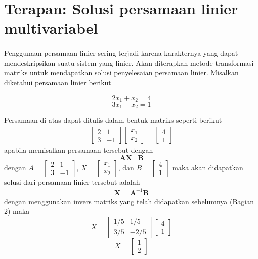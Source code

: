 \section{Terapan: Solusi persamaan linier multivariabel}
		\paragraph*{} Penggunaan persamaan linier sering terjadi karena karakternya yang dapat mendeskripsikan suatu sistem yang linier. Akan diterapkan metode transformasi matriks untuk mendapatkan solusi penyelesaian persamaan linier. Misalkan diketahui persamaan linier berikut
		
		$$2x_1 + x_2  = 4$$
		$$3x_1 - x_2  = 1$$ 
		
		Persamaan di atas dapat ditulis dalam bentuk matriks seperti berikut
		\begin{align*}
		 \left[
		\begin{array}{rr} 
			2 & 1 \\
			3 & -1 
		\end{array} 
		\right] 
		\left[
		\begin{array}{r} 
			x_1 \\ 
			x_2  
		\end{array}
		\right]
		=
		\left[
		\begin{array}{r} 
			4 \\ 
			1 
		\end{array}
		\right]
		\end{align*}
	apabila memisalkan persamaan tersebut dengan 
	$$\textbf{AX=B}$$
	dengan $A=\left[
	\begin{array}{rr} 
		2 & 1 \\
		3 & -1 
	\end{array} 
	\right]$, $X=\left[
	\begin{array}{r} 
		x_1 \\ 
		x_2  
	\end{array}
	\right]$, dan $B=\left[
	\begin{array}{r} 
		4 \\ 
		1 
	\end{array}
	\right]$ maka akan didapatkan solusi dari persamaan linier tersebut adalah
	\begin{align*}
		\textbf{X}=\textbf{A}^{-1}\textbf{B}
	\end{align*}
	dengan menggunakan invers matriks yang telah didapatkan sebelumnya (Bagian 2) maka
	$$X=\left[
	\begin{array}{rr} 
		1/5 & 1/5 \\
		3/5 & -2/5 
	\end{array} 
	\right]\left[
	\begin{array}{r} 
		4 \\ 
		1 
	\end{array}
	\right]$$
	$$X=\left[
	\begin{array}{r} 
		1 \\ 
		2 
	\end{array}
	\right]$$
	
